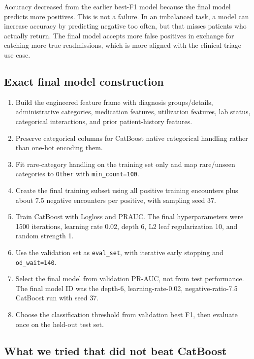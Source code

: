 \documentclass[10pt]{article}
\newcommand{\tightsubsection}[1]{\vspace{2pt}\subsection{#1}\vspace{-3pt}}
\begin{document}
Accuracy decreased from the earlier best-F1 model because the final model predicts more positives. This is not a failure. In an imbalanced task, a model can increase accuracy by predicting negative too often, but that misses patients who actually return. The final model accepts more false positives in exchange for catching more true readmissions, which is more aligned with the clinical triage use case.

\tightsubsection{Exact final model construction}

\begin{enumerate}
    \item Build the engineered feature frame with diagnosis groups/details, administrative categories, medication features, utilization features, lab status, categorical interactions, and prior patient-history features.
    \item Preserve categorical columns for CatBoost native categorical handling rather than one-hot encoding them.
    \item Fit rare-category handling on the training set only and map rare/unseen categories to \texttt{Other} with \texttt{min\_count=100}.
    \item Create the final training subset using all positive training encounters plus about 7.5 negative encounters per positive, with sampling seed 37.
    \item Train CatBoost with Logloss and PRAUC. The final hyperparameters were 1500 iterations, learning rate 0.02, depth 6, L2 leaf regularization 10, and random strength 1.
    \item Use the validation set as \texttt{eval\_set}, with iterative early stopping and \texttt{od\_wait=140}.
    \item Select the final model from validation PR-AUC, not from test performance. The final model ID was the depth-6, learning-rate-0.02, negative-ratio-7.5 CatBoost run with seed 37.
    \item Choose the classification threshold from validation best F1, then evaluate once on the held-out test set.
\end{enumerate}

\tightsubsection{What we tried that did not beat CatBoost}
\end{document}
